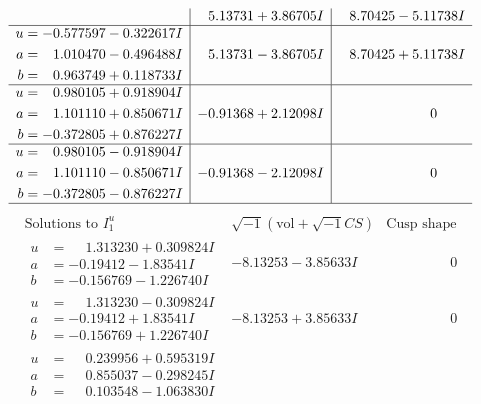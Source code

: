 \documentclass[1p]{elsarticle_modified}
\theoremstyle{definition}
\newcommand{\I}{\sqrt{-1}}
\begin{document}
$$\begin{array}{c|c|c}
 & \phantom{-}5.13731 + 3.86705 I & \phantom{-}8.70425 - 5.11738 I \\ \hline\begin{aligned}
u &= -0.577597 - 0.322617 I \\
a &= \phantom{-}1.010470 - 0.496488 I \\
b &= \phantom{-}0.963749 + 0.118733 I\end{aligned}
 & \phantom{-}5.13731 - 3.86705 I & \phantom{-}8.70425 + 5.11738 I \\ \hline\begin{aligned}
u &= \phantom{-}0.980105 + 0.918904 I \\
a &= \phantom{-}1.101110 + 0.850671 I \\
b &= -0.372805 + 0.876227 I\end{aligned}
 & -0.91368 + 2.12098 I & \phantom{-0.000000 } 0 \\ \hline\begin{aligned}
u &= \phantom{-}0.980105 - 0.918904 I \\
a &= \phantom{-}1.101110 - 0.850671 I \\
b &= -0.372805 - 0.876227 I\end{aligned}
 & -0.91368 - 2.12098 I & \phantom{-0.000000 } 0\\
 \hline 
 \end{array}$$\newpage$$\begin{array}{c|c|c}  
\text{Solutions to }I^u_{1}& \I (\text{vol} + \sqrt{-1}CS) & \text{Cusp shape}\\
 \hline 
\begin{aligned}
u &= \phantom{-}1.313230 + 0.309824 I \\
a &= -0.19412 - 1.83541 I \\
b &= -0.156769 - 1.226740 I\end{aligned}
 & -8.13253 - 3.85633 I & \phantom{-0.000000 } 0 \\ \hline\begin{aligned}
u &= \phantom{-}1.313230 - 0.309824 I \\
a &= -0.19412 + 1.83541 I \\
b &= -0.156769 + 1.226740 I\end{aligned}
 & -8.13253 + 3.85633 I & \phantom{-0.000000 } 0 \\ \hline\begin{aligned}
u &= \phantom{-}0.239956 + 0.595319 I \\
a &= \phantom{-}0.855037 - 0.298245 I \\
b &= \phantom{-}0.103548 - 1.063830 I\end{aligned}

\end{array}$$
\end{document}
